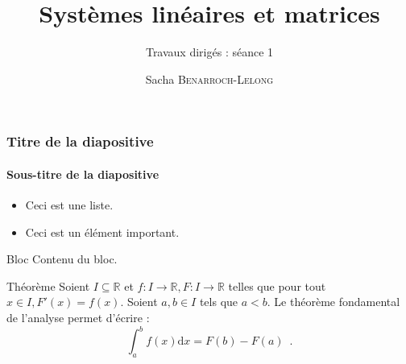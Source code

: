 \documentclass[french]{bmagi}
\title{Systèmes linéaires et matrices}
\subtitle{Travaux dirigés : séance 1}
\author{Sacha \textsc{Benarroch-Lelong}}
\begin{document}
	\titlepage
	
	\begin{frame}
		\frametitle{Titre de la diapositive}
		\framesubtitle{Sous-titre de la diapositive}
		\begin{itemize}
			\item Ceci est une liste.
			\item Ceci est un élément \alert{important}.
		\end{itemize}
		\begin{block}{Bloc}
			Contenu du bloc.
		\end{block}
		\begin{alertblock}{Théorème}
			Soient $I\subseteq\mathbb{R}$ et $f:I\to\mathbb{R}, F:I\to\mathbb{R}$ telles que pour tout $x\in I, F'(x)=f(x)$. Soient $a,b\in I$ tels que $a<b$. Le théorème fondamental de l'analyse permet d'écrire :
			\[
				\int_a^bf(x)\mathrm{d}x=F(b)-F(a)\enspace.
			\]
		\end{alertblock}
	\end{frame}
\end{document}
